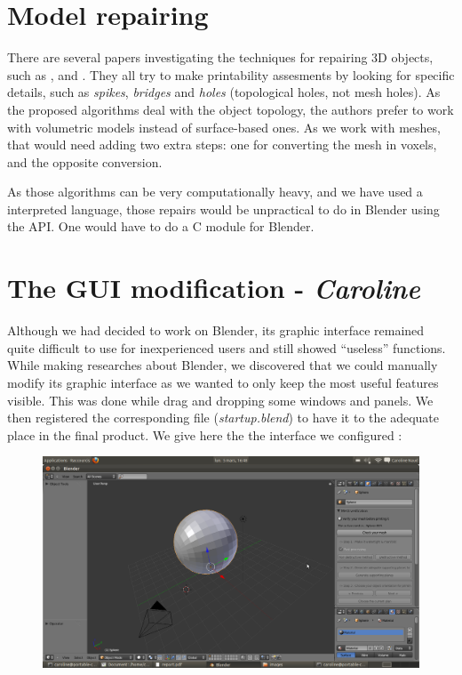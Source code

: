 \documentclass{report}
\begin{document}
\section{Model repairing}\label{sec:repairing}

There are several papers investigating the techniques for repairing 3D objects, such as \cite{volum_simp}, \cite{printability} and \cite{noise_removal}. They all try to make printability assesments by looking for specific details, such as \emph{spikes}, \emph{bridges} and \emph{holes} (topological holes, not mesh holes). As the proposed algorithms deal with the object topology, the authors prefer to work with volumetric models instead of surface-based ones. As we work with meshes, that would need adding two extra steps: one for converting the mesh in voxels, and the opposite conversion.

As those algorithms can be very computationally heavy, and we have used a interpreted language, those repairs would be unpractical to do in Blender using the API. One would have to do a C module for Blender.

\section{The GUI modification - \textit{Caroline}}

Although we had decided to work on Blender, its graphic interface remained quite difficult to use for inexperienced users and still showed ``useless'' functions. \\
While making researches about Blender, we discovered that we could manually modify its graphic interface as we wanted to only keep the most useful features visible. This was done while drag 	and dropping some windows and panels. We then registered the corresponding file (\textit{startup.blend}) to have it to the adequate place in the final product. We give here the the interface we configured :

\bigskip
\bigskip

\begin{figure}[!h]
\begin{center}
	\includegraphics[scale=0.3]{NotreInterface}
\end{center}
\end{figure}
\end{document}
